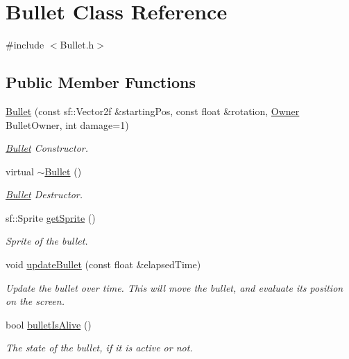 \hypertarget{class_bullet}{}\section{Bullet Class Reference}
\label{class_bullet}


{\ttfamily \#include $<$Bullet.\+h$>$}

\subsection*{Public Member Functions}
\begin{DoxyCompactItemize}
\item 
\hyperlink{class_bullet_a751da85d043013c509426b6cf33bd9c5}{Bullet} (const sf\+::\+Vector2f \&starting\+Pos, const float \&rotation, \hyperlink{_bullet_8h_a3b5e9e55eb7b08d5702a101e529e5507}{Owner} Bullet\+Owner, int damage=1)
\begin{DoxyCompactList}\small\item\em \hyperlink{class_bullet}{Bullet} Constructor. \end{DoxyCompactList}\item 
virtual \hyperlink{class_bullet_aaeb5cb41d7db89f49007b08b41f1bfcf}{$\sim$\+Bullet} ()
\begin{DoxyCompactList}\small\item\em \hyperlink{class_bullet}{Bullet} Destructor. \end{DoxyCompactList}\item 
sf\+::\+Sprite \hyperlink{class_bullet_aa313bc0e2c9fd200c526cb6fe320462c}{get\+Sprite} ()
\begin{DoxyCompactList}\small\item\em Sprite of the bullet. \end{DoxyCompactList}\item 
void \hyperlink{class_bullet_a241c1ceb808ae0f93e4f66f28bbd525f}{update\+Bullet} (const float \&elapsed\+Time)
\begin{DoxyCompactList}\small\item\em Update the bullet over time. This will move the bullet, and evaluate its position on the screen. \end{DoxyCompactList}\item 
bool \hyperlink{class_bullet_a103ff9146dce215f15ca0c4282a5a8cf}{bullet\+Is\+Alive} ()
\begin{DoxyCompactList}\small\item\em The state of the bullet, if it is active or not. \end{DoxyCompactList}\item 

\end{DoxyCompactItemize}
